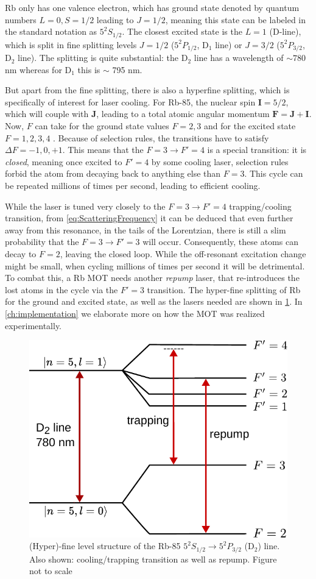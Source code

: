 Rb only has one valence electron, which has ground state denoted by quantum numbers $L=0, S=1/2$ leading to $J=1/2$, meaning this state can be labeled in the standard notation as $5^2S_{1/2}$.
The closest excited state is the $L=1$ (D-line), which is split in fine splitting levels $J=1/2$ ($5^2P_{1/2}$, D$_1$ line) or $J=3/2$ ($5^2P_{3/2}$, D$_2$ line).
The splitting is quite substantial: the D$_2$ line has a wavelength of $\sim780$ nm whereas for D$_1$ this is $\sim$ 795 nm.

But apart from the fine splitting, there is also a hyperfine splitting, which is specifically of interest for laser cooling.
For Rb-85, the nuclear spin $\mathbf{I}=5/2$, which will couple with $\mathbf{J}$, leading to a total atomic angular momentum $\mathbf{F} = \mathbf{J} + \mathbf{I}$.
Now, $F$ can take for the ground state values $F=2,3$ and for the excited state $F=1,2,3,4$ \cite{Steck2008}. 
Because of selection rules, the transitions have to satisfy $\Delta F = -1, 0, +1$. 
This means that the $F = 3 \rightarrow F'=4$ is a special transition: it is \textit{closed}, meaning once excited to $F'=4$ by some cooling laser, selection rules forbid the atom from decaying back to anything else than $F=3$. 
This cycle can be repeated millions of times per second, leading to efficient cooling.

While the laser is tuned very closely to the $F = 3 \rightarrow F'=4$ trapping/cooling transition, from \cref{eq:ScatteringFrequency} it can be deduced that even further away from this resonance, in the tails of the Lorentzian, there is still a slim probability that the $F=3 \rightarrow F'=3$ will occur.
Consequently, these atoms can decay to $F=2$, leaving the closed loop.
While the off-resonant excitation change might be small, when cycling millions of times per second it will be detrimental. 
To combat this, a Rb \ac{MOT} needs another \textit{repump} laser, that re-introduces the lost atoms in the cycle via the $F'=3$ transition.
The hyper-fine splitting of Rb for the ground and excited state, as well as the lasers needed are shown in \cref{fig:D2line}.
In \cref{ch:implementation} we elaborate more on how the MOT was realized experimentally. 

\begin{figure}
    \centering
    \includegraphics[width=0.54\linewidth]{figures/D2line.pdf}
    \caption{(Hyper)-fine level structure of the Rb-85 $5^{2}S_{1/2} \rightarrow 5 ^2P_{3/2}$ (D$_2$) line. Also shown: cooling/trapping transition as well as repump. Figure not to scale}
    \label{fig:D2line}
\end{figure}


